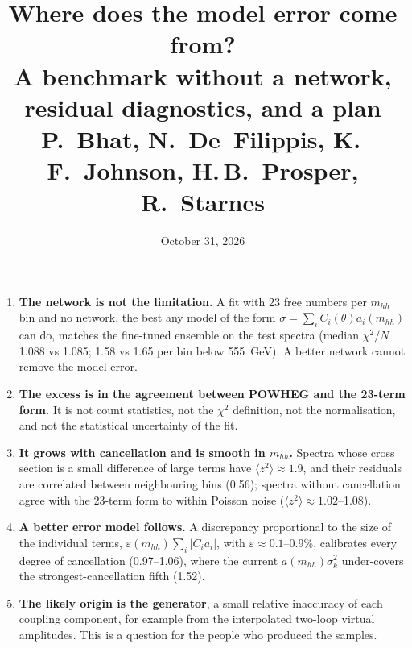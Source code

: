 
\title{\textbf{Where does the model error come from?}\\[4pt]
\large A benchmark without a network, residual diagnostics, and a plan\\[4pt]
\normalsize P.~Bhat, N.~De~Filippis, K.\,F.~Johnson, H.\,B.~Prosper, R.~Starnes}
\date{October 31, 2026}

\maketitle

\begin{keyidea}[In brief]
\begin{enumerate}
  \item \textbf{The network is not the limitation.} A fit with 23 free numbers per $m_{hh}$
    bin and no network, the best any model of the form $\sigma = \sum_i C_i(\theta)a_i(m_{hh})$
    can do, matches the fine-tuned ensemble on the test spectra (median $\chi^2/N$ 1.088 vs
    1.085; 1.58 vs 1.65 per bin below 555~GeV). A better network cannot remove the model error.
  \item \textbf{The excess is in the agreement between POWHEG and the 23-term form.} It is
    not count statistics, not the $\chi^2$ definition, not the normalisation, and not the
    statistical uncertainty of the fit.
  \item \textbf{It grows with cancellation and is smooth in $m_{hh}$.} Spectra whose cross
    section is a small difference of large terms have $\langle z^2\rangle \approx 1.9$, and
    their residuals are correlated between neighbouring bins (0.56); spectra without
    cancellation agree with the 23-term form to within Poisson noise ($\langle z^2\rangle
    \approx 1.02$--1.08).
  \item \textbf{A better error model follows.} A discrepancy proportional to the size of the
    individual terms, $\varepsilon(m_{hh})\sum_i|C_ia_i|$, with $\varepsilon \approx
    0.1$--0.9\%, calibrates every degree of cancellation (0.97--1.06), where the current
    $a(m_{hh})\sigma_k^2$ under-covers the strongest-cancellation fifth (1.52).
  \item \textbf{The likely origin is the generator}, a small relative inaccuracy of each
    coupling component, for example from the interpolated two-loop virtual amplitudes.
    This is a question for the people who produced the samples.
\end{enumerate}
\end{keyidea}

